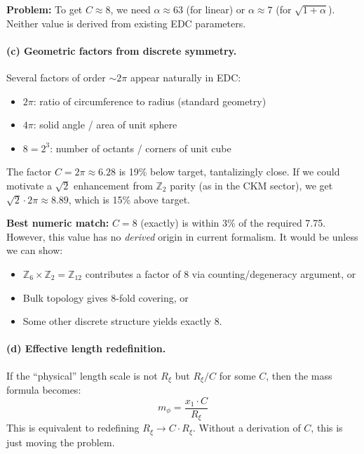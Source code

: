 \textbf{Problem:} To get $C \approx 8$, we need $\alpha \approx 63$ (for linear)
or $\alpha \approx 7$ (for $\sqrt{1+\alpha}$). Neither value is derived from
existing EDC parameters.

\paragraph{(c) Geometric factors from discrete symmetry.}

Several factors of order $\sim 2\pi$ appear naturally in EDC:
\begin{itemize}[nosep]
    \item $2\pi$: ratio of circumference to radius (standard geometry)
    \item $4\pi$: solid angle / area of unit sphere
    \item $8 = 2^3$: number of octants / corners of unit cube
\end{itemize}

The factor $C = 2\pi \approx 6.28$ is 19\% below target, tantalizingly close.
If we could motivate a $\sqrt{2}$ enhancement from $\mathbb{Z}_2$ parity
(as in the CKM sector), we get $\sqrt{2} \cdot 2\pi \approx 8.89$, which is
15\% above target.

\textbf{Best numeric match:} $C = 8$ (exactly) is within 3\% of the required 7.75.
However, this value has no \emph{derived} origin in current formalism. It would
be \tagP{} unless we can show:
\begin{itemize}[nosep]
    \item $\mathbb{Z}_6 \times \mathbb{Z}_2 = \mathbb{Z}_{12}$ contributes a factor of 8
          via counting/degeneracy argument, or
    \item Bulk topology gives 8-fold covering, or
    \item Some other discrete structure yields exactly 8.
\end{itemize}

\paragraph{(d) Effective length redefinition.}

If the ``physical'' length scale is not $R_\xi$ but $R_\xi / C$ for some $C$,
then the mass formula becomes:
\begin{equation}
    m_\phi = \frac{x_1 \cdot C}{R_\xi}
    \label{eq:ch11_ell_eff}
\end{equation}
This is equivalent to redefining $R_\xi \to C \cdot R_\xi$. Without a derivation
of $C$, this is just moving the problem.

